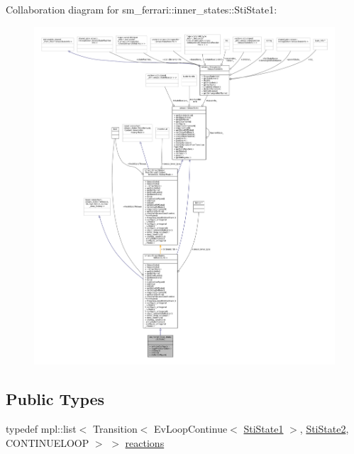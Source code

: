 Collaboration diagram for sm\+\_\+ferrari\+:\+:inner\+\_\+states\+:\+:Sti\+State1\+:
\nopagebreak
\begin{figure}[H]
\begin{center}
\leavevmode
\includegraphics[width=350pt]{structsm__ferrari_1_1inner__states_1_1StiState1__coll__graph}
\end{center}
\end{figure}
\subsection*{Public Types}
\begin{DoxyCompactItemize}
\item 
typedef mpl\+::list$<$ Transition$<$ Ev\+Loop\+Continue$<$ \hyperlink{structsm__ferrari_1_1inner__states_1_1StiState1}{Sti\+State1} $>$, \hyperlink{structsm__ferrari_1_1inner__states_1_1StiState2}{Sti\+State2}, C\+O\+N\+T\+I\+N\+U\+E\+L\+O\+OP $>$ $>$ \hyperlink{structsm__ferrari_1_1inner__states_1_1StiState1_aa7e9f074031e748f9f1a66a45399cc10}{reactions}
\end{DoxyCompactItemize}
